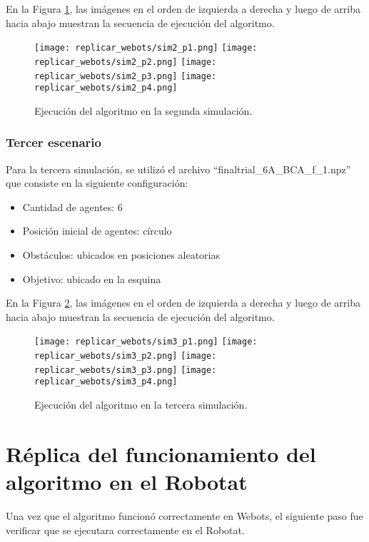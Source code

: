 En la Figura \ref{fig:segunda_simulacion}, las imágenes en el orden de izquierda a derecha y luego de arriba hacia abajo muestran la secuencia de ejecución del algoritmo.

\begin{figure}[H]
	\centering
	\texttt{[image: replicar\_webots/sim2\_p1.png]}
	\texttt{[image: replicar\_webots/sim2\_p2.png]}
	\texttt{[image: replicar\_webots/sim2\_p3.png]}
	\texttt{[image: replicar\_webots/sim2\_p4.png]}
	\caption{Ejecución del algoritmo en la segunda simulación.}
	\label{fig:segunda_simulacion}
\end{figure}

\subsubsection{Tercer escenario}
Para la tercera simulación, se utilizó el archivo ``finaltrial\_6A\_BCA\_f\_1.npz'' que consiste en la siguiente configuración:

\begin{itemize}
	\item Cantidad de agentes: 6
	\item Posición inicial de agentes: círculo
	\item Obstáculos: ubicados en posiciones aleatorias
	\item Objetivo: ubicado en la esquina
\end{itemize}

En la Figura \ref{fig:tercera_simulacion}, las imágenes en el orden de izquierda a derecha y luego de arriba hacia abajo muestran la secuencia de ejecución del algoritmo.

\begin{figure}[H]
	\centering
	\texttt{[image: replicar\_webots/sim3\_p1.png]}
	\texttt{[image: replicar\_webots/sim3\_p2.png]}
	\texttt{[image: replicar\_webots/sim3\_p3.png]}
	\texttt{[image: replicar\_webots/sim3\_p4.png]}
	\caption{Ejecución del algoritmo en la tercera simulación.}
	\label{fig:tercera_simulacion}
\end{figure}

\section{Réplica del funcionamiento del algoritmo en el Robotat}
Una vez que el algoritmo funcionó correctamente en Webots, el siguiente paso fue verificar que se ejecutara correctamente en el Robotat.

